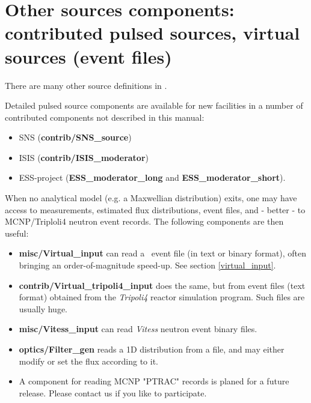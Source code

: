 \newpage


\newpage


\newpage


\newpage


\newpage


\newpage


%

\newpage


\newpage


\newpage
\section{Other sources components: contributed pulsed sources, virtual sources (event files)}
\label{sources-seealso}

There are many other source definitions in \MCS .

Detailed pulsed source components are available for new facilities
in a number of contributed components not described in this manual:
\begin{itemize}
\item SNS ({\bf contrib/SNS\_source})
\item ISIS ({\bf contrib/ISIS\_moderator})
\item ESS-project ({\bf ESS\_moderator\_long} and {\bf  ESS\_moderator\_short}).
\end{itemize}

When no analytical model (e.g. a Maxwellian distribution) exits,
one may have access to measurements, estimated flux distributions,
event files, and - better - to MCNP/Triploli4 neutron event records.
The following components are then useful:

\begin{itemize}
\item{{\bf misc/Virtual\_input} can read a \MCS\ event file
(in text or binary format), often bringing an order-of-magnitude speed-up.
See section \ref{virtual_input}.}
\item{{\bf contrib/Virtual\_tripoli4\_input} does the same, but from event files (text format) obtained from the \emph{Tripoli4} \cite{tripoli_webpage} reactor simulation program. Such files are usually huge.}
\item{{\bf misc/Vitess\_input} can read \emph{Vitess} \cite{vitess_webpage} neutron event binary files.}
\item{{\bf optics/Filter\_gen} reads a 1D distribution from a file, and may either modify or set the flux according to it.}
\item{A component for reading MCNP "PTRAC" records is planed for a future release.
Please contact us if you like to participate.}
\end{itemize}
